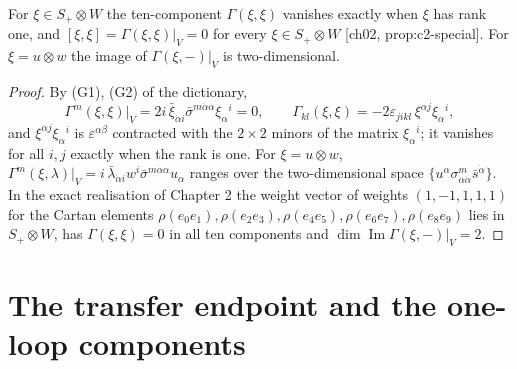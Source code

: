 \begin{lemma}
\label{lem:o-rankone}
For $\xi\in S_+\otimes W$ the ten-component $\Gamma(\xi,\xi)$ vanishes exactly when $\xi$ has rank one, and $[\xi,\xi]=\Gamma(\xi,\xi)|_V=0$ for every $\xi\in S_+\otimes W$ [ch02, prop:c2-special]. For $\xi=u\otimes w$ the image of $\Gamma(\xi,-)|_V$ is two-dimensional.
\end{lemma}

\begin{proof}
By (G1), (G2) of the dictionary,
\[
\Gamma^m(\xi,\xi)\big|_V=2i\,\bar\xi_{\dot\alpha i}\bar\sigma^{m\dot\alpha\alpha}\xi_\alpha{}^i=0,\qquad \Gamma_{kl}(\xi,\xi)=-2\varepsilon_{jikl}\,\xi^{\alpha j}\xi_\alpha{}^i ,
\]
and $\xi^{\alpha j}\xi_\alpha{}^i$ is $\varepsilon^{\alpha\beta}$ contracted with the $2\times2$ minors of the matrix $\xi_\alpha{}^i$; it vanishes for all $i,j$ exactly when the rank is one. For $\xi=u\otimes w$, $\Gamma^m(\xi,\lambda)|_V=i\,\bar\lambda_{\dot\alpha i}w^i\bar\sigma^{m\dot\alpha\alpha}u_\alpha$ ranges over the two-dimensional space $\{u^\alpha\sigma^m_{\alpha\dot\alpha}\bar s^{\dot\alpha}\}$. In the exact realisation of Chapter 2 the weight vector of weights $(1,-1,1,1,1)$ for the Cartan elements $\rho(e_0e_1),\rho(e_2e_3),\rho(e_4e_5),\rho(e_6e_7),\rho(e_8e_9)$ lies in $S_+\otimes W$, has $\Gamma(\xi,\xi)=0$ in all ten components and $\dim\operatorname{Im}\Gamma(\xi,-)|_V=2$.
\end{proof}

\section{The transfer endpoint and the one-loop components}

